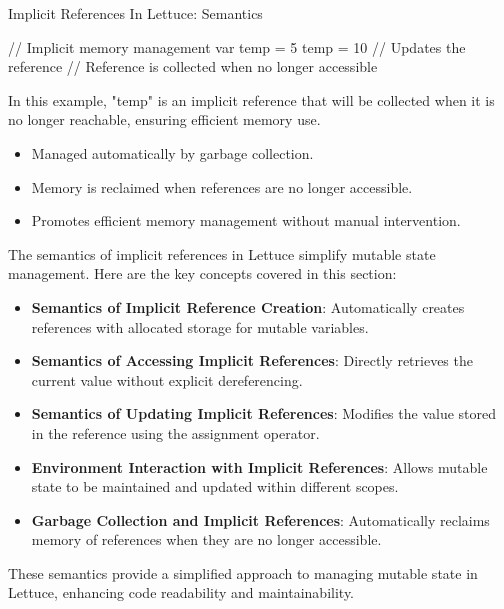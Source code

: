 \begin{notes}{Implicit References In Lettuce: Semantics}
\begin{highlight}
    \begin{code}[Lettuce]
    // Implicit memory management
    var temp = 5
    temp = 10 // Updates the reference
    // Reference is collected when no longer accessible
    \end{code}
    
        In this example, "temp" is an implicit reference that will be collected when it is no longer reachable, ensuring efficient memory use.
    
        \begin{itemize}
            \item Managed automatically by garbage collection.
            \item Memory is reclaimed when references are no longer accessible.
            \item Promotes efficient memory management without manual intervention.
        \end{itemize}
    
    \end{highlight}
    
    \begin{highlight}
    
        The semantics of implicit references in Lettuce simplify mutable state management. Here are the key concepts covered in this section:
    
        \begin{itemize}
            \item \textbf{Semantics of Implicit Reference Creation}: Automatically creates references with allocated storage for mutable variables.
            \item \textbf{Semantics of Accessing Implicit References}: Directly retrieves the current value without explicit dereferencing.
            \item \textbf{Semantics of Updating Implicit References}: Modifies the value stored in the reference using the assignment operator.
            \item \textbf{Environment Interaction with Implicit References}: Allows mutable state to be maintained and updated within different scopes.
            \item \textbf{Garbage Collection and Implicit References}: Automatically reclaims memory of references when they are no longer accessible.
        \end{itemize}
    
        These semantics provide a simplified approach to managing mutable state in Lettuce, enhancing code readability and maintainability.
    
    \end{highlight}
\end{notes}

